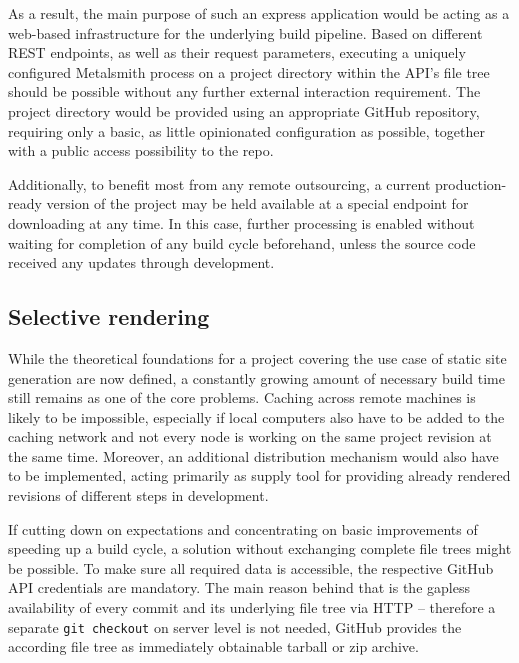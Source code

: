 

As a result, the main purpose of such an express application would be acting as a web-based infrastructure for the underlying build pipeline. Based on different REST endpoints, as well as their request parameters, executing a uniquely configured Metalsmith process on a project directory within the API's file tree should be possible without any further external interaction requirement. The project directory would be provided using an appropriate GitHub repository, requiring only a basic, as little opinionated configuration as possible, together with a public access possibility to the repo.

Additionally, to benefit most from any remote outsourcing, a current production-ready version of the project may be held available at a special endpoint for downloading at any time. In this case, further processing is enabled without waiting for completion of any build cycle beforehand, unless the source code received any updates through development.


\subsection{Selective rendering}
\label{sec:primarythoughts-rendering}

While the theoretical foundations for a project covering the use case of static site generation are now defined, a constantly growing amount of necessary build time still remains as one of the core problems. Caching across remote machines is likely to be impossible, especially if local computers also have to be added to the caching network and not every node is working on the same project revision at the same time. Moreover, an additional distribution mechanism would also have to be implemented, acting primarily as supply tool for providing already rendered revisions of different steps in development.

If cutting down on expectations and concentrating on basic improvements of speeding up a build cycle, a solution without exchanging complete file trees might be possible. To make sure all required data is accessible, the respective GitHub API credentials are mandatory. The main reason behind that is the gapless availability of every commit and its underlying file tree via HTTP -- therefore a separate \texttt{git checkout} on server level is not needed, GitHub provides the according file tree as immediately obtainable tarball or zip archive.

